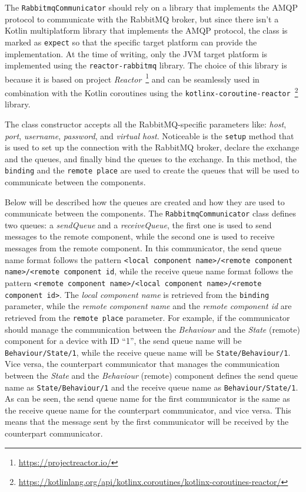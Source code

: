 The \texttt{RabbitmqCommunicator} should rely on a library that implements the AMQP protocol to communicate with the RabbitMQ broker, but since
there isn't a Kotlin multiplatform library that implements the AMQP protocol, the class is marked as \texttt{expect} so that the specific target
platform can provide the implementation. At the time of writing, only the JVM target platform is implemented using the \texttt{reactor-rabbitmq}
library. The choice of this library is because it is based on project \emph{Reactor}~\footnote{\url{https://projectreactor.io/}} and can be
seamlessly used in combination with the Kotlin coroutines using the
\texttt{kotlinx-coroutine-reactor}~\footnote{\url{https://kotlinlang.org/api/kotlinx.coroutines/kotlinx-coroutines-reactor/}} library.

The class constructor accepts all the RabbitMQ-specific parameters like: \emph{host}, \emph{port}, \emph{username}, \emph{password}, and
\emph{virtual host}.
Noticeable is the \texttt{setup} method that is used to set up the connection with the RabbitMQ broker, declare the exchange and the queues, and
finally bind the queues to the exchange. In this method, the \texttt{binding} and the \texttt{remote place} are used to create the queues that will
be used to communicate between the components.

Below will be described how the queues are created and how they are used to communicate between the components.
The \texttt{RabbitmqCommunicator} class defines two queues: a \emph{sendQueue} and a \emph{receiveQueue}, the first one is used to send messages to
the remote component, while the second one is used to receive messages from the remote component.
In this communicator, the send queue name format follows the pattern \texttt{<local component name>/<remote component name>/<remote component id},
while the receive queue name format follows the pattern \texttt{<remote component name>/<local component name>/<remote component id>}.
The \emph{local component name} is retrieved from the \texttt{binding} parameter, while the \emph{remote component name} and the
\emph{remote component id} are retrieved from the \texttt{remote place} parameter.
For example, if the communicator should manage the communication between the \emph{Behaviour} and the \emph{State} (remote) component for a device
with ID ``1'', the send queue name will be \texttt{Behaviour/State/1}, while the receive queue name will be \texttt{State/Behaviour/1}.
Vice versa, the counterpart communicator that manages the communication between the \emph{State} and the \emph{Behaviour} (remote) component
defines the send queue name as \texttt{State/Behaviour/1} and the receive queue name as \texttt{Behaviour/State/1}.
As can be seen, the send queue name for the first communicator is the same as the receive queue name for the counterpart communicator, and vice versa.
This means that the message sent by the first communicator will be received by the counterpart communicator.

